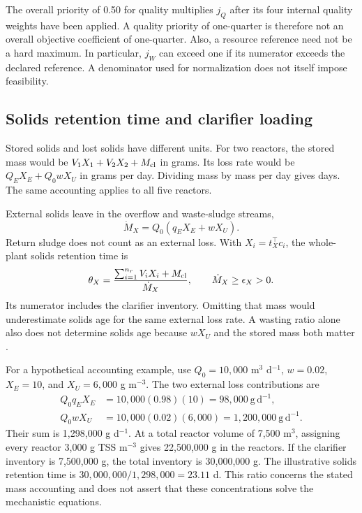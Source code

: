 The overall priority of 0.50 for quality multiplies $j_Q$ after its four internal quality weights have been applied. A quality priority of one-quarter is therefore not an overall objective coefficient of one-quarter. Also, a resource reference need not be a hard maximum. In particular, $j_W$ can exceed one if its numerator exceeds the declared reference. A denominator used for normalization does not itself impose feasibility.

\subsection{Solids retention time and clarifier loading}

Stored solids and lost solids have different units. For two reactors, the stored mass would be $V_1X_1+V_2X_2+M_{\rm cl}$ in grams. Its loss rate would be $Q_EX_E+Q_0wX_U$ in grams per day. Dividing mass by mass per day gives days. The same accounting applies to all five reactors.

External solids leave in the overflow and waste-sludge streams,
\begin{equation}
\dot M_X=Q_0(q_EX_E+wX_U).
\label{eq:plant_external_solids_loss}
\end{equation}
Return sludge does not count as an external loss. With $X_i=t_X^\top c_i$, the whole-plant solids retention time is
\begin{equation}
\theta_X=\frac{\sum_{i=1}^{n_r}V_iX_i+M_{\rm cl}}{\dot M_X},
\qquad\dot M_X\ge\epsilon_X>0.
\label{eq:plant_solids_age}
\end{equation}
Its numerator includes the clarifier inventory. Omitting that mass would underestimate solids age for the same external loss rate. A wasting ratio alone also does not determine solids age because $wX_U$ and the stored mass both matter \citep{Alex2008}.

For a hypothetical accounting example, use $Q_0=10{,}000$ m$^3$ d$^{-1}$, $w=0.02$, $X_E=10$, and $X_U=6{,}000$ g m$^{-3}$. The two external loss contributions are
\begin{align}
Q_0q_EX_E&=10{,}000(0.98)(10)=98{,}000\ \mathrm{g\,d^{-1}},\\
Q_0wX_U&=10{,}000(0.02)(6{,}000)=1{,}200{,}000\ \mathrm{g\,d^{-1}}.
\end{align}
Their sum is 1{,}298{,}000 g d$^{-1}$. At a total reactor volume of 7{,}500 m$^3$, assigning every reactor 3{,}000 g TSS m$^{-3}$ gives 22{,}500{,}000 g in the reactors. If the clarifier inventory is 7{,}500{,}000 g, the total inventory is 30{,}000{,}000 g. The illustrative solids retention time is $30{,}000{,}000/1{,}298{,}000=23.11$ d. This ratio concerns the stated mass accounting and does not assert that these concentrations solve the mechanistic equations.


